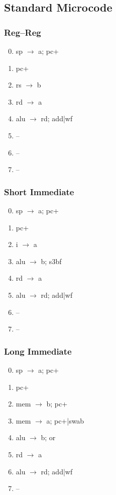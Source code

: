 \documentclass[11pt]{book}
\begin{document}
\subsection*{Standard Microcode}
\begin{multicols}{3}\ttfamily\selectfont\small
  \subsubsection*{Reg--Reg}
  \begin{enumerate}\setcounter{enumi}{-1}
  \item sp \(\rightarrow\) a; pc+
  \item pc+
  \item rs \(\rightarrow\) b
  \item rd \(\rightarrow\) a
  \item alu \(\rightarrow\) rd; add|wf
  \item --
  \item --
  \item --
  \end{enumerate}
  \columnbreak
  \subsubsection*{Short Immediate}
  \begin{enumerate}\setcounter{enumi}{-1}
  \item sp \(\rightarrow\) a; pc+
  \item pc+
  \item i \(\rightarrow\) a
  \item alu \(\rightarrow\) b; s3bf
  \item rd \(\rightarrow\) a
  \item alu \(\rightarrow\) rd; add|wf
  \item --
  \item --
  \end{enumerate}
  \columnbreak
  \subsubsection*{Long Immediate}
  \begin{enumerate}\setcounter{enumi}{-1}
  \item sp \(\rightarrow\) a; pc+
  \item pc+
  \item mem \(\rightarrow\) b; pc+
  \item mem \(\rightarrow\) a; pc+|swab
  \item alu \(\rightarrow\) b; or
  \item rd \(\rightarrow\) a
  \item alu \(\rightarrow\) rd; add|wf
  \item --
  \end{enumerate}
\end{multicols}
\end{document}

